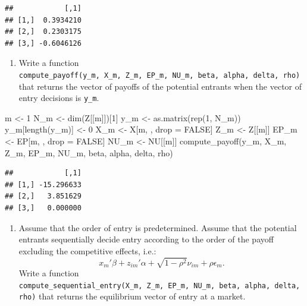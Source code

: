 \documentclass[
]{book}
\newenvironment{Shaded}{\begin{snugshade}}{\end{snugshade}}
\newcommand{\ConstantTok}[1]{\textcolor[rgb]{0.00,0.00,0.00}{#1}}
\newcommand{\DecValTok}[1]{\textcolor[rgb]{0.00,0.00,0.81}{#1}}
\newcommand{\FunctionTok}[1]{\textcolor[rgb]{0.00,0.00,0.00}{#1}}
\newcommand{\NormalTok}[1]{#1}
\newcommand{\OtherTok}[1]{\textcolor[rgb]{0.56,0.35,0.01}{#1}}
\providecommand{\tightlist}{%
  \setlength{\itemsep}{0pt}\setlength{\parskip}{0pt}}
\begin{document}
\begin{verbatim}
##            [,1]
## [1,]  0.3934210
## [2,]  0.2303175
## [3,] -0.6046126
\end{verbatim}

\begin{enumerate}
\def\labelenumi{\arabic{enumi}.}
\setcounter{enumi}{3}
\tightlist
\item
  Write a function \texttt{compute\_payoff(y\_m,\ X\_m,\ Z\_m,\ EP\_m,\ NU\_m,\ beta,\ alpha,\ delta,\ rho)} that returns the vector of payoffs of the potential entrants when the vector of entry decisions is \texttt{y\_m}.
\end{enumerate}

\begin{Shaded}
\begin{Highlighting}[]
\NormalTok{m }\OtherTok{\textless{}{-}} \DecValTok{1}
\NormalTok{N\_m }\OtherTok{\textless{}{-}} \FunctionTok{dim}\NormalTok{(Z[[m]])[}\DecValTok{1}\NormalTok{]}
\NormalTok{y\_m }\OtherTok{\textless{}{-}} \FunctionTok{as.matrix}\NormalTok{(}\FunctionTok{rep}\NormalTok{(}\DecValTok{1}\NormalTok{, N\_m))}
\NormalTok{y\_m[}\FunctionTok{length}\NormalTok{(y\_m)] }\OtherTok{\textless{}{-}} \DecValTok{0}
\NormalTok{X\_m }\OtherTok{\textless{}{-}}\NormalTok{ X[m, , drop }\OtherTok{=} \ConstantTok{FALSE}\NormalTok{]}
\NormalTok{Z\_m }\OtherTok{\textless{}{-}}\NormalTok{ Z[[m]]}
\NormalTok{EP\_m }\OtherTok{\textless{}{-}}\NormalTok{ EP[m, , drop }\OtherTok{=} \ConstantTok{FALSE}\NormalTok{]}
\NormalTok{NU\_m }\OtherTok{\textless{}{-}}\NormalTok{ NU[[m]]}
\FunctionTok{compute\_payoff}\NormalTok{(y\_m, X\_m, Z\_m, EP\_m, NU\_m, beta, alpha, delta, rho)}
\end{Highlighting}
\end{Shaded}

\begin{verbatim}
##            [,1]
## [1,] -15.296633
## [2,]   3.851629
## [3,]   0.000000
\end{verbatim}

\begin{enumerate}
\def\labelenumi{\arabic{enumi}.}
\setcounter{enumi}{4}
\tightlist
\item
  Assume that the order of entry is predetermined. Assume that the potential entrants sequentially decide entry according to the order of the payoff excluding the competitive effects, i.e.:
  \[
  x_m'\beta + z_{im}'\alpha + \sqrt{1 - \rho^2} \nu_{im} + \rho \epsilon_{m}.
  \]
  Write a function \texttt{compute\_sequential\_entry(X\_m,\ Z\_m,\ EP\_m,\ NU\_m,\ beta,\ alpha,\ delta,\ rho)} that returns the equilibrium vector of entry at a market.
\end{enumerate}
\end{document}
